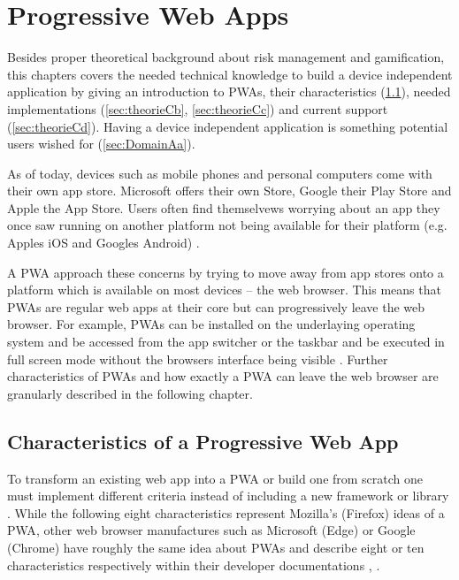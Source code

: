 \section{Progressive Web Apps}
\label{sec:theorieC}

Besides proper theoretical background about risk management and gamification, this chapters covers the needed technical knowledge to build a device independent application by giving an introduction to \acl{PWA}s, their characteristics (\ref{sec:theorieCa}), needed implementations (\ref{sec:theorieCb}, \ref{sec:theorieCc}) and current support (\ref{sec:theorieCd}). Having a device independent application is something potential users wished for (\ref{sec:DomainAa}). 

As of today, devices such as mobile phones and personal computers come with their own app store. Microsoft offers their own Store, Google their Play Store and Apple the App Store. Users often find themselvews worrying about an app they once saw running on another platform not being available for their platform (e.g. Apples iOS and Googles Android) \cite[p. 3]{sheppardBeginningProgressiveWeb2017}.

A \ac{PWA} approach these concerns by trying to move away from app stores onto a platform which is available on most devices – the web browser. This means that \acs{PWA}s are regular web apps at their core but can progressively leave the web browser. For example, \acs{PWA}s can be installed on the underlaying operating system and be accessed from the app switcher or the taskbar and be executed in full screen mode without the browsers interface being visible \cite[p. 26]{liebelProgressiveWebApps2019}. Further characteristics of  \acs{PWA}s and how exactly a  \acs{PWA} can leave the web browser are granularly described in the following chapter.


\subsection{Characteristics of a Progressive Web App}
\label{sec:theorieCa}


To transform an existing web app into a  \acs{PWA} or build one from scratch one must implement different criteria instead of including a new framework or library \cite[p. 6]{sheppardBeginningProgressiveWeb2017}.
While the following eight characteristics represent Mozilla’s (Firefox) ideas of a  \acs{PWA}, other web browser manufactures such as Microsoft (Edge) or Google (Chrome) have roughly the same idea about  \acs{PWA}s and describe eight or ten characteristics respectively within their developer documentations \cite[p. 90]{liebelProgressiveWebApps2019}, \cite{ProgressiveWebApps}.

